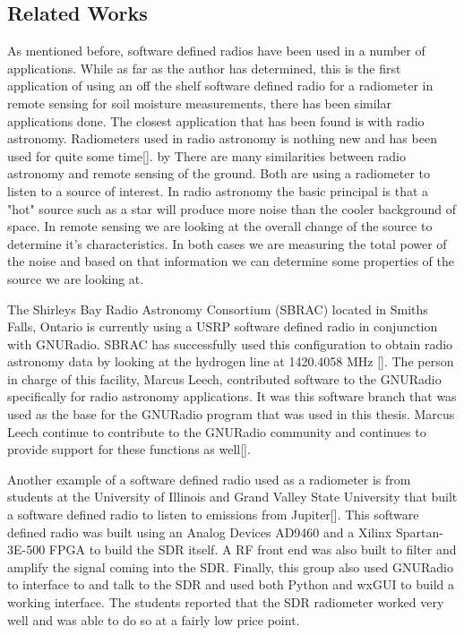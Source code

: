 \subsection{Related Works}
As mentioned before, software defined radios have been used in a number of applications.  While as far as the author has determined, this is the first application of using an off the shelf software defined radio for a radiometer in remote sensing for soil moisture measurements, there has been similar applications done.  The closest application that has been found is with radio astronomy.  Radiometers used in radio astronomy is nothing new and has been used for quite some time[\cite{Ohm}]. by There are many similarities between radio astronomy and remote sensing of the ground.  Both are using a radiometer to listen to a source of interest.  In radio astronomy the basic principal is that a "hot" source such as a star will produce more noise than the cooler background of space.  In remote sensing we are looking at the overall change of the source to determine it's characteristics.  In both cases we are measuring the total power of the noise and based on that information we can determine some properties of the source we are looking at.

The Shirleys Bay Radio Astronomy Consortium (SBRAC) located in Smiths Falls, Ontario is currently using a USRP software defined radio in conjunction with GNURadio.  SBRAC has successfully used this configuration to obtain radio astronomy data by looking at the hydrogen line at 1420.4058 MHz [\cite{Leech2007}].  The person in charge of this facility, Marcus Leech, contributed software to the GNURadio specifically for radio astronomy applications.  It was this software branch that was used as the base for the GNURadio program that was used in this thesis.  Marcus Leech continue to contribute to the GNURadio community and continues to provide support for these functions as well[\cite{Leech}].

Another example of a software defined radio used as a radiometer is from students at the University of Illinois and Grand Valley State University that built a software defined radio to listen to emissions from Jupiter[\cite{Behnke}].  This software defined radio was built using an Analog Devices AD9460 and a Xilinx Spartan-3E-500 FPGA to build the SDR itself.  A RF front end was also built to filter and amplify the signal coming into the SDR.  Finally, this group also used GNURadio to interface to and talk to the SDR and used both Python and wxGUI to build a working interface.  The students reported that the SDR radiometer worked very well and was able to do so at a fairly low price point.

